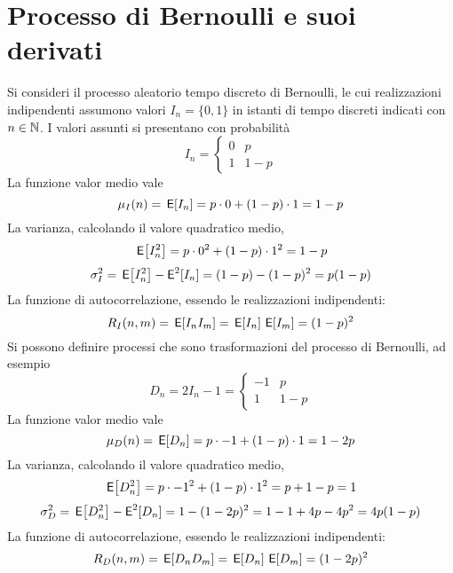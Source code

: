 \section{Processo di Bernoulli e suoi derivati}
Si consideri il processo aleatorio tempo discreto di Bernoulli, le cui realizzazioni indipendenti assumono valori $I_n=\{0,1\}$ in istanti di tempo discreti indicati con $n\in\mathbb{N}$. I valori assunti si presentano con probabilità
\begin{equation}I_n=\begin{cases}0&p\\1&1-p\end{cases}\end{equation}
La funzione valor medio vale
\begin{equation}\mu_I(n)=\,{\operatorname{\mathsf{E}}}\!\left[{I_n}\right]=p\cdot 0+(1-p)\cdot 1=1-p\end{equation}
La varianza, calcolando il valore quadratico medio,
\[\,{\operatorname{\mathsf{E}}}\!\left[{I^2_n}\right]=p\cdot 0^2+(1-p)\cdot 1^2=1-p\]
\begin{equation}\sigma^2_I=\,{\operatorname{\mathsf{E}}}\!\left[{I^2_n}\right]-\operatorname{\mathsf{E}}^2[I_n]=(1-p)-(1-p)^2=p(1-p)\end{equation}
La funzione di autocorrelazione, essendo le realizzazioni indipendenti:
\begin{equation}R_I(n,m)=\,{\operatorname{\mathsf{E}}}\!\left[{I_n I_m}\right]=\,{\operatorname{\mathsf{E}}}\!\left[{I_n}\right]\,{\operatorname{\mathsf{E}}}\!\left[{I_m}\right]=(1-p)^2\end{equation}
Si possono definire processi che sono trasformazioni del processo di Bernoulli, ad esempio
\begin{equation}D_n=2I_n-1=\begin{cases}-1&p\\1&1-p\end{cases}\end{equation}
La funzione valor medio vale
\begin{equation}\mu_D(n)=\,{\operatorname{\mathsf{E}}}\!\left[{D_n}\right]=p\cdot -1+(1-p)\cdot 1=1-2p\end{equation}
La varianza, calcolando il valore quadratico medio,
\[\,{\operatorname{\mathsf{E}}}\!\left[{D^2_n}\right]=p\cdot -1^2+(1-p)\cdot 1^2=p+1-p=1\]
\begin{equation}\sigma^2_D=\,{\operatorname{\mathsf{E}}}\!\left[{D^2_n}\right]-\operatorname{\mathsf{E}}^2[D_n]=1-(1-2p)^2=1-1+4p-4p^2=4p(1-p)\end{equation}
La funzione di autocorrelazione, essendo le realizzazioni indipendenti:
\begin{equation}R_D(n,m)=\,{\operatorname{\mathsf{E}}}\!\left[{D_n D_m}\right]=\,{\operatorname{\mathsf{E}}}\!\left[{D_n}\right]\,{\operatorname{\mathsf{E}}}\!\left[{D_m}\right]=(1-2p)^2\end{equation}

